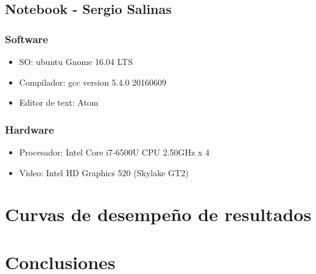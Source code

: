 \documentclass[12pt,letterpaper]{scrartcl}
\begin{document}
\subsection{Notebook - Sergio Salinas}
\subsubsection{Software}
\begin{itemize}
\item  SO: ubuntu Gnome 16.04 LTS
\item Compilador: gcc version 5.4.0 20160609 
\item Editor de text: Atom
\end{itemize}

\subsubsection{Hardware}
\begin{itemize}
\item Procesador: Intel Core i7-6500U CPU  2.50GHz x 4 
\item Video: Intel HD Graphics 520 (Skylake GT2) 
\end{itemize}




\section{Curvas de desempeño de resultados}

\section{Conclusiones}
\end{document}
